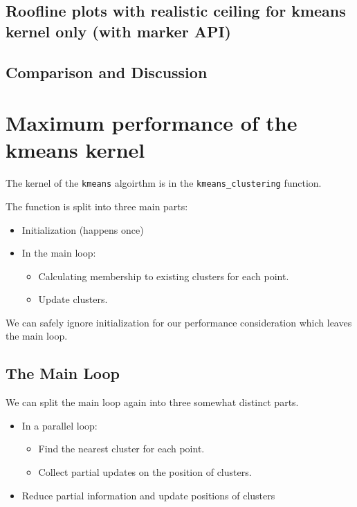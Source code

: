 \subsection{Roofline plots with realistic ceiling for kmeans kernel only (with marker API)}

\subsection{Comparison and Discussion}
















\section{Maximum performance of the kmeans kernel}

The kernel of the \texttt{kmeans} algoirthm is in the \texttt{kmeans\_clustering} function.

The function is split into three main parts:
\begin{itemize}
	\item Initialization (happens once)
	\item In the main loop:
	\begin{itemize}
		\item Calculating membership to existing clusters for each point.
		\item Update clusters.
	\end{itemize}
\end{itemize}

We can safely ignore initialization for our performance consideration which leaves the main loop.

\newpage
\subsection{The Main Loop}

We can split the main loop again into three somewhat distinct parts.
\begin{itemize}
	\item In a parallel loop:
	\begin{itemize}
		\item Find the nearest cluster for each point.
		\item Collect partial updates on the position of clusters.
	\end{itemize}
	\item Reduce partial information and update positions of clusters 	
\end{itemize}

